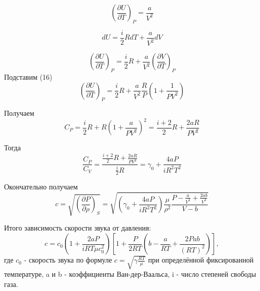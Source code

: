\documentclass[a4paper,12pt]{article}
\begin{document}
\begin{equation}
	\left ( \frac{\partial U}{\partial T}\right )_P = \frac{a}{V^2}
\end{equation}

\begin{equation}
	dU = \frac{i}{2}RdT + \frac{a}{V^2}dV
\end{equation}

\begin{equation}
	\left ( \frac{\partial U}{\partial T}\right )_P = \frac{i}{2}R + \frac{a}{V^2}\left ( \frac{\partial V}{\partial T}\right )_P
\end{equation}
Подставим (16)
\begin{equation}
	\left ( \frac{\partial U}{\partial T}\right )_P = \frac{i}{2}R + \frac{a}{V^2}\frac{R}{P}\left(1 + \frac{1}{PV^2}\right)
\end{equation}

Получаем
\begin{equation}
	C_P = \frac{i}{2}R + R\left(1 + \frac{a}{PV^2}\right)^2 = \frac{i+2}{2}R + \frac{2aR}{PV^2}
\end{equation}

Тогда 
\begin{equation}
	\frac{C_P}{C_V} = \frac{\frac{i+2}{2}R + \frac{2aR}{PV^2}}{\frac{i}{2}R} = \gamma_0 + \frac{4aP}{iR^2T^2}
\end{equation}

Окончательно получаем 
\begin{equation}
	c = \sqrt{\left ( \frac{\partial P}{\partial \rho}\right )_S} = \sqrt{\left(\gamma_0 + \frac{4aP}{iR^2T^2}\right)\frac{\mu}{\rho^2}\frac{P - \frac{a}{V^2} + \frac{2ab}{V^3}}{V - b}}
\end{equation}

Итого зависимость скорости звука от давления:
\begin{equation}
	c = c_0 \left ( 1 + \frac{2aP}{iRT\mu c^2_0} \right )\left [ 1 + \frac{P}{2RT} \left ( b - \frac{a}{RT} + \frac{2Pab}{(RT)^2} \right ) \right ],
\end{equation}
где $c_0$ - скорость звука по формуле $c = \sqrt{\gamma \frac{RT}{\mu}}$ при определённой фиксированной температуре, a и b - коэффициенты Ван-дер-Ваальса, i - число степеней свободы газа.
\end{document}
